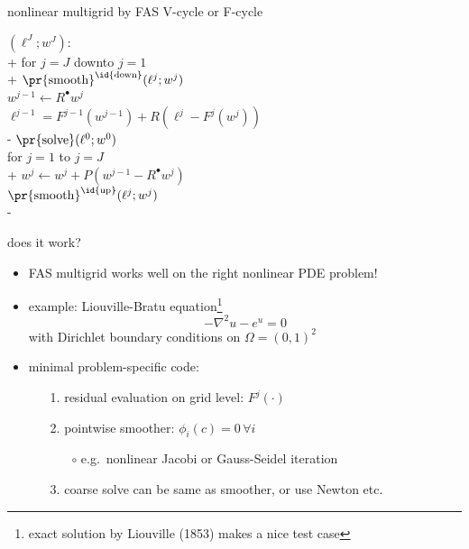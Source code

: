 \documentclass[svgnames,
               hyperref={colorlinks,citecolor=DeepPink4,linkcolor=FireBrick,urlcolor=Maroon},
               usepdftitle=false]  %
               {beamer}
\newcommand{\iR}{R^{\bullet}}
\begin{document}
\begin{frame}{nonlinear multigrid by FAS V-cycle or F-cycle}
{\small
\begin{pseudo}
$(\ell^J;w^J)$: \\+
    for $j=J$ downto $j=1$ \\+
      $\text{\pr{smooth}}^{\text{\id{down}}}(\ell^j; w^j)$ \\
      $w^{j-1} \gets \iR w^j$ \\
      $\ell^{j-1} = F^{j-1}(w^{j-1}) + R \left(\ell^j - F^j(w^j)\right)$ \\-
    $\text{\pr{solve}}(\ell^0;w^0)$ \\
    for $j=1$ to $j=J$ \\+
      $w^j \gets w^j + P (w^{j-1} - \iR w^j)$ \\
      $\text{\pr{smooth}}^{\text{\id{up}}}(\ell^j;w^j)$ \\-
\end{pseudo}
}
\end{frame}


\begin{frame}{does it work?}

\begin{itemize}
\item FAS multigrid works well on the right nonlinear PDE problem!
\item example: Liouville-Bratu equation\footnote{exact solution by Liouville (1853) makes a nice test case}
    $$-\nabla^2 u - e^u = 0$$
with Dirichlet boundary conditions on $\Omega=(0,1)^2$
\item minimal problem-specific code:
    \begin{enumerate}
    \item[1.] residual evaluation on grid level: $F^j(\cdot)$
    \item[2.] pointwise smoother: $\phi_i(c) = 0 \,\forall i$
        \begin{itemize}
        \item[$\circ$] e.g.~nonlinear Jacobi or Gauss-Seidel iteration
        \end{itemize}
    \item[3.] coarse solve can be same as smoother, or use Newton etc.
    \end{enumerate}
\end{itemize}
\end{frame}
\end{document}
